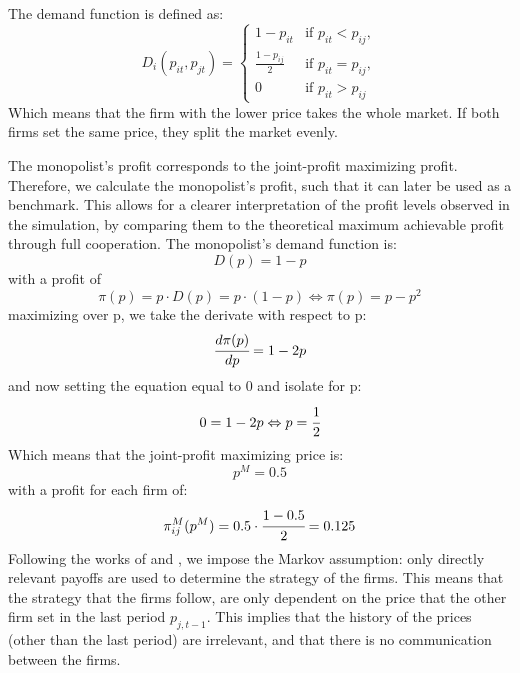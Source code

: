 \documentclass{article}
\begin{document}
\newline
The demand function is defined as:
\begin{equation}
D_i(p_{it},p_{jt}) =
\begin{cases}
  1-p_{it} &\text{if } p_{it} < p_{ij},\\
  \frac{1-p_{ij}}{2}   & \text{if } p_{it} =p_{ij},\\
  0   & \text{if } p_{it} > p_{ij}
\end{cases}
\end{equation}
Which means that the firm with the lower price takes the whole market. If both firms set the same price, they split the market evenly. 





The monopolist's profit corresponds to the joint-profit maximizing profit. Therefore, we calculate the monopolist's profit, such that it can later be used as a benchmark. This allows for a clearer interpretation of the profit levels observed in the simulation, by comparing them to the theoretical maximum achievable profit through full cooperation.
\newline
The monopolist's demand function is:
\begin{equation}
    D(p) = 1-p
\end{equation}
with a profit of
\begin{equation}
    \pi (p) = p \cdot D(p) = p \cdot (1-p) \Leftrightarrow \pi (p) = p - p^2
\end{equation}
maximizing over p, we take the derivate with respect to p: 
\begin{equation}
    \cfrac{d \pi(p) }{d p} = 1-2p
\end{equation}
and now setting the equation equal to 0 and isolate for p:
\begin{equation}
    0 = 1 - 2p \Leftrightarrow p = \cfrac{1}{2}
\end{equation}
Which means that the joint-profit maximizing price is:
\begin{equation}
    p^M = 0.5
\end{equation}
with a profit for each firm of:
\begin{equation}
\label{MonopolistPrice}
\pi_{ij}^M (p^M) = 0.5 \cdot \cfrac{1 - 0.5}{2} = 0.125
\end{equation}
\label{Joint_profit_price}
\newline
Following the works of \cite{Klein2021} and \cite{MaskinTirole}, we impose the Markov assumption: only directly relevant payoffs are used to determine the strategy of the firms. This means that the strategy that the firms follow, are only dependent on the price that the other firm set in the last period $p_{j,t-1}$. This implies that the history of the prices (other than the last period) are irrelevant, and that there is no communication between the firms.
\end{document}
